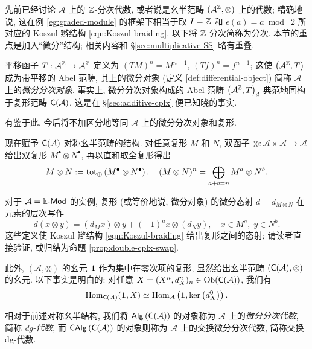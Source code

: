 先前已经讨论 $\mathcal{A}$ 上的 $\mathbb{Z}$-分次代数, 或者说是幺半范畴 $(\mathcal{A}^{\mathbb{Z}}, \otimes)$ 上的代数; 精确地说, 这在例 \ref{eg:graded-module} 的框架下相当于取 $I = \mathbb{Z}$ 和 $\epsilon(a) = a \bmod\; 2$ 所对应的 Koszul 辫结构 \eqref{eqn:Koszul-braiding}. 以下将 $\mathbb{Z}$-分次简称为分次. 本节的重点是加入``微分''结构; 相关内容和 \S\ref{sec:multiplicative-SS} 略有重叠.

平移函子 $T: \mathcal{A}^{\mathbb{Z}} \to \mathcal{A}^{\mathbb{Z}}$ 定义为 $(TM)^n = M^{n+1}$, $(Tf)^n = f^{n+1}$; 这使 $\left(\mathcal{A}^{\mathbb{Z}}, T\right)$ 成为带平移的 Abel 范畴, 其上的微分对象 (定义 \ref{def:differential-object}) 简称 $\mathcal{A}$ 上的\emph{微分分次对象}. 事实上, 微分分次对象构成的 Abel 范畴 $\left(\mathcal{A}^{\mathbb{Z}}, T\right)_d$ 典范地同构于复形范畴 $\mathsf{C}(\mathcal{A})$. 这是在 \S\ref{sec:additive-cplx} 便已知晓的事实.

有鉴于此, 今后将不加区分地等同 $\mathcal{A}$ 上的微分分次对象和复形.

现在赋予 $\mathsf{C}(\mathcal{A})$ 对称幺半范畴的结构. 对任意复形 $M$ 和 $N$, 双函子 $\otimes: \mathcal{A} \times \mathcal{A} \to \mathcal{A}$ 给出双复形 $M^\bullet \otimes N^\bullet$, 再以直和取全复形得出
\[ M \otimes N := \operatorname{tot}_{\oplus}\left( M^\bullet \otimes N^\bullet \right), \quad (M \otimes N)^n = \bigoplus_{a+b=n} M^a \otimes N^b. \]

对于 $\mathcal{A} = \Bbbk\text{-}\mathsf{Mod}$ 的实例, 复形 (或等价地说, 微分对象) 的微分态射 $d = d_{M \otimes N}$ 在元素的层次写作
\begin{equation*}
	d(x \otimes y) = (d_M x) \otimes y + (-1)^a x \otimes (d_N y), \quad x \in M^a, \; y \in N^b.
\end{equation*}
这些定义使 Koszul 辫结构 \eqref{eqn:Koszul-braiding} 给出复形之间的态射; 请读者直接验证, 或归结为命题 \ref{prop:double-cplx-swap}.

此外, $(\mathcal{A}, \otimes)$ 的幺元 $\bm{1}$ 作为集中在零次项的复形, 显然给出幺半范畴 $(\mathsf{C}(\mathcal{A}), \otimes)$ 的幺元. 以下事实是明白的: 对任意 $X = (X^n, d_X^n)_n \in \operatorname{Ob}(\mathsf{C}(\mathcal{A}))$, 我们有
\begin{equation}\label{eqn:unit-map-into-cplx}
	\operatorname{Hom}_{\mathsf{C}(\mathcal{A})}(\bm{1}, X) \simeq \operatorname{Hom}_{\mathcal{A}}\left( \bm{1}, \operatorname{ker}\left(d_X^0 \right) \right).
\end{equation}

\begin{definition}\label{def:dg-algebra}
	相对于前述对称幺半结构, 我们将 $\mathsf{Alg}\left(\mathsf{C}(\mathcal{A})\right)$ 的对象称为 $\mathcal{A}$ 上的\emph{微分分次代数}, 简称 \emph{dg-代数}, 而 $\mathsf{CAlg}\left(\mathsf{C}(\mathcal{A})\right)$ 的对象则称为 $\mathcal{A}$ 上的交换微分分次代数, 简称交换 dg-代数.
\end{definition}

